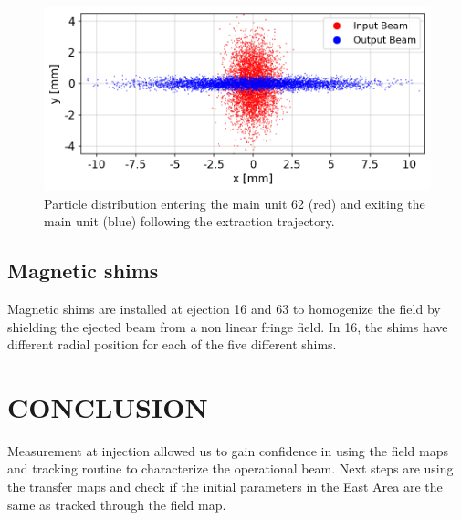 \documentclass[a4paper,
               biblatex,     %
               keeplastbox,   %
               ]{jacow}
\begin{document}

\begin{figure}[!htb]
   \centering
   \includegraphics*[width=1.0\columnwidth]{particle_distribution.png}
   \caption{Particle distribution entering the main unit 62 (red) and exiting the main unit (blue) following the extraction trajectory.}
   \label{fig:particle_distribution}
\end{figure}

\subsection{Magnetic shims}

Magnetic shims are installed at ejection 16 and 63 to homogenize the field by shielding the ejected beam from a non linear fringe field. In 16, the shims have different radial position for each of the five different shims.


\section{CONCLUSION}

Measurement at injection allowed us to gain confidence in using the field maps and tracking routine to characterize the operational beam. Next steps are using the transfer maps and check if the initial parameters in the East Area are the same as tracked through the field map.



\printbibliography
\end{document}
